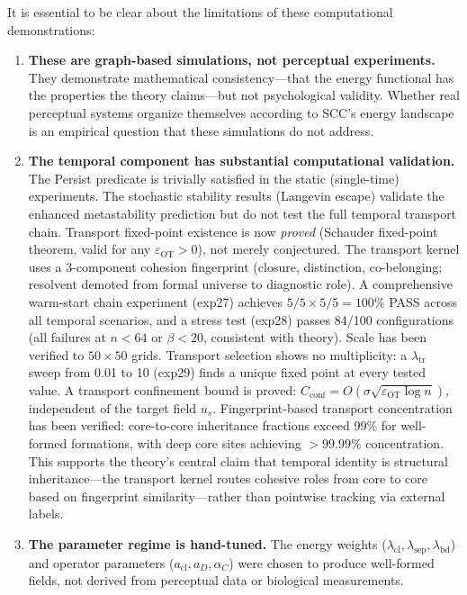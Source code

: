 \documentclass[lettersize,journal]{IEEEtran}
\begin{document}
It is essential to be clear about the limitations of these computational demonstrations:

\begin{enumerate}
\item \textbf{These are graph-based simulations, not perceptual experiments.} They demonstrate mathematical consistency---that the energy functional has the properties the theory claims---but not psychological validity. Whether real perceptual systems organize themselves according to SCC's energy landscape is an empirical question that these simulations do not address.

\item \textbf{The temporal component has substantial computational validation.} The Persist predicate is trivially satisfied in the static (single-time) experiments. The stochastic stability results (Langevin escape) validate the enhanced metastability prediction but do not test the full temporal transport chain. Transport fixed-point existence is now \emph{proved} (Schauder fixed-point theorem, valid for any $\varepsilon_{\mathrm{OT}} > 0$), not merely conjectured. The transport kernel uses a 3-component cohesion fingerprint (closure, distinction, co-belonging; resolvent demoted from formal universe to diagnostic role). A comprehensive warm-start chain experiment (exp27) achieves $5/5 \times 5/5 = 100\%$ PASS across all temporal scenarios, and a stress test (exp28) passes 84/100 configurations (all failures at $n < 64$ or $\beta < 20$, consistent with theory). Scale has been verified to $50 \times 50$ grids. Transport selection shows no multiplicity: a $\lambda_{\mathrm{tr}}$ sweep from 0.01 to 10 (exp29) finds a unique fixed point at every tested value. A transport confinement bound is proved: $C_{\mathrm{conf}} = O(\sigma \sqrt{\varepsilon_{\mathrm{OT}} \log n})$, independent of the target field $u_s$. Fingerprint-based transport concentration has been verified: core-to-core inheritance fractions exceed $99\%$ for well-formed formations, with deep core sites achieving $>99.99\%$ concentration. This supports the theory's central claim that temporal identity is structural inheritance---the transport kernel routes cohesive roles from core to core based on fingerprint similarity---rather than pointwise tracking via external labels.

\item \textbf{The parameter regime is hand-tuned.} The energy weights ($\lambda_{\mathrm{cl}}, \lambda_{\mathrm{sep}}, \lambda_{\mathrm{bd}}$) and operator parameters ($a_{\mathrm{cl}}, a_D, \alpha_C$) were chosen to produce well-formed fields, not derived from perceptual data or biological measurements.


\end{enumerate}
\end{document}
